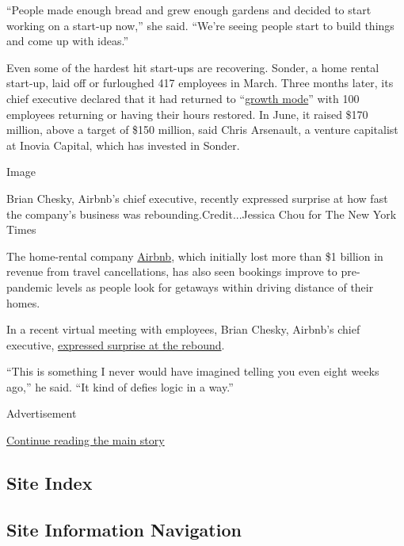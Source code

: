 ``People made enough bread and grew enough gardens and decided to start
working on a start-up now,'' she said. ``We're seeing people start to
build things and come up with ideas.''

Even some of the hardest hit start-ups are recovering. Sonder, a home
rental start-up, laid off or furloughed 417 employees in March. Three
months later, its chief executive declared that it had returned to
``\href{https://cheddar.com/media/sonder-ceo-says-m-series-e-puts-rental-company-back-into-growth-mode}{growth
mode}'' with 100 employees returning or having their hours restored. In
June, it raised \$170 million, above a target of \$150 million, said
Chris Arsenault, a venture capitalist at Inovia Capital, which has
invested in Sonder.

Image

Brian Chesky, Airbnb's chief executive, recently expressed surprise at
how fast the company's business was rebounding.Credit...Jessica Chou for
The New York Times

The home-rental company
\href{https://www.nytimes3xbfgragh.onion/2020/07/17/technology/airbnb-coronavirus-layoffs-.html}{Airbnb},
which initially lost more than \$1 billion in revenue from travel
cancellations, has also seen bookings improve to pre-pandemic levels as
people look for getaways within driving distance of their homes.

In a recent virtual meeting with employees, Brian Chesky, Airbnb's chief
executive,
\href{https://www.nytimes3xbfgragh.onion/2020/07/15/technology/airbnb-ipo.html}{expressed
surprise at the rebound}.

``This is something I never would have imagined telling you even eight
weeks ago,'' he said. ``It kind of defies logic in a way.''

Advertisement

\protect\hyperlink{after-bottom}{Continue reading the main story}

\hypertarget{site-index}{%
\subsection{Site Index}\label{site-index}}

\hypertarget{site-information-navigation}{%
\subsection{Site Information
Navigation}\label{site-information-navigation}}

